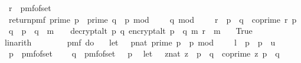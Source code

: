 \begin{isabellebody}
\ \ r\ {\isasymleftarrow}\ pmf{\isacharunderscore}{\kern0pt}of{\isacharunderscore}{\kern0pt}set\ {\isasymZ}{\isacharsemicolon}{\kern0pt}\isanewline
\ \ return{\isacharunderscore}{\kern0pt}pmf\ {\isacharparenleft}{\kern0pt}{\isacharparenleft}{\kern0pt}prime\ p\ {\isasymand}\ prime\ q\ {\isasymand}\ p\ mod\ {}\ {\isacharequal}{\kern0pt}\ {}\ {\isasymand}\ q\ mod\ {}\ {\isacharequal}{\kern0pt}\ {}\ {\isasymand}\ r\ {\isacharless}{\kern0pt}\ p\ {\isacharasterisk}{\kern0pt}\ q\ {\isasymand}\ coprime\ r\ {\isacharparenleft}{\kern0pt}p\ {\isacharasterisk}{\kern0pt}\ q{\isacharparenright}{\kern0pt}\ {\isasymand}\ p\ {\isasymnoteq}\ q\ {\isasymand}\ m\ {\isasymnoteq}\ {\isacharbrackleft}{\kern0pt}{\isacharbrackright}{\kern0pt}{\isacharparenright}{\kern0pt}\ {\isasymor}\ decrypt{\isacharunderscore}{\kern0pt}alt\ p\ q\ {\isacharparenleft}{\kern0pt}encrypt{\isacharunderscore}{\kern0pt}alt\ {\isacharparenleft}{\kern0pt}p\ {\isacharasterisk}{\kern0pt}\ q{\isacharparenright}{\kern0pt}\ m\ r{\isacharparenright}{\kern0pt}\ {\isacharequal}{\kern0pt}\ m{\isacharparenright}{\kern0pt}{\isacharbraceright}{\kern0pt}{\isacharparenright}{\kern0pt}\ \isanewline
\ \ True{\isachardoublequoteclose}\ \isanewline
\ \ \ \ \isamarkupfalse%
\ linarith\isanewline
\ \ \isamarkupfalse%
\ \isamarkupfalse%
\ {\isachardoublequoteopen}\isanewline
\ \ pmf\ {\isacharparenleft}{\kern0pt}do\ {\isacharbraceleft}{\kern0pt}\isanewline
\ \ let\ {\isasymK}\ {\isacharequal}{\kern0pt}\ {\isacharbraceleft}{\kern0pt}{\isacharparenleft}{\kern0pt}p{\isacharcolon}{\kern0pt}{\isacharcolon}{\kern0pt}nat{\isacharparenright}{\kern0pt}{\isachardot}{\kern0pt}\ prime\ p\ {\isasymand}\ p\ mod\ {}\ {\isacharequal}{\kern0pt}\ {}\ {\isasymand}\ l\ {\isasymle}\ p\ {\isasymand}\ p\ {\isasymle}\ u{\isacharbraceright}{\kern0pt}{\isacharsemicolon}{\kern0pt}\isanewline
\ \ p\ {\isasymleftarrow}\ pmf{\isacharunderscore}{\kern0pt}of{\isacharunderscore}{\kern0pt}set\ {\isasymK}{\isacharsemicolon}{\kern0pt}\ \isanewline
\ \ q\ {\isasymleftarrow}\ pmf{\isacharunderscore}{\kern0pt}of{\isacharunderscore}{\kern0pt}set\ {\isacharparenleft}{\kern0pt}{\isasymK}\ {\isacharminus}{\kern0pt}\ {\isacharbraceleft}{\kern0pt}p{\isacharbraceright}{\kern0pt}{\isacharparenright}{\kern0pt}{\isacharsemicolon}{\kern0pt}\isanewline
\ \ let\ {\isasymZ}\ {\isacharequal}{\kern0pt}\ {\isacharbraceleft}{\kern0pt}{\isacharparenleft}{\kern0pt}z{\isacharcolon}{\kern0pt}{\isacharcolon}{\kern0pt}nat{\isacharparenright}{\kern0pt}{\isachardot}{\kern0pt}\ z\ {\isacharless}{\kern0pt}\ p\ {\isacharasterisk}{\kern0pt}\ q\ {\isasymand}\ coprime\ z\ {\isacharparenleft}{\kern0pt}p\ {\isacharasterisk}{\kern0pt}\ q{\isacharparenright}{\kern0pt}{\isacharbraceright}{\kern0pt}{\isacharsemicolon}{\kern0pt}\isanewline

\end{isabellebody}
